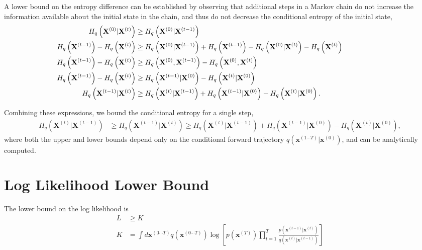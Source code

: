 \documentclass{article}
\newcommand{\mb}{\mathbf}
\newcommand{\pf}{q\left( \mb x^{(t)} | \mb x^{(t-1)} \right)}
\newcommand{\qr}{p\left( \mb x^{(t-1)} | \mb x^{(t)} \right)}
\newcommand{\qst}{p \left( \mb x^{(T)} \right)}
\newcommand{\ptraj}{q\left( \mb x^{(0\cdots T)} \right)}
\newcommand{\pcondtraj}{q\left( \mb x^{(1\cdots T)} | \mb x^{(0)} \right)}
\begin{document}
A lower bound on the entropy difference can be established by observing that additional steps in a Markov chain do not increase the information 
available about the initial state in the chain, and thus do not decrease the conditional entropy of the initial state,
\begin{align}
\hspace{-2cm}
H_q\left( \mb X^{(0)} | \mb X^{(t)} \right) &\ge H_q\left( \mb X^{(0)} | \mb X^{(t-1)} \right) \\
\hspace{-2cm}
H_q\left( \mb X^{(t-1)} \right) - H_q\left( \mb X^{(t)} \right) &\ge
	H_q\left( \mb X^{(0)} | \mb X^{(t-1)} \right) + H_q\left( \mb X^{(t-1)} \right) - H_q\left( \mb X^{(0)} | \mb X^{(t)} \right) - H_q\left( \mb X^{(t)} \right) \\
\hspace{-2cm}
H_q\left( \mb X^{(t-1)} \right) - H_q\left( \mb X^{(t)} \right) &\ge
	H_q\left( \mb X^{(0)}, \mb X^{(t-1)} \right) - H_q\left( \mb X^{(0)}, \mb X^{(t)} \right)  \\
\hspace{-2cm}
H_q\left( \mb X^{(t-1)} \right) - H_q\left( \mb X^{(t)} \right) &\ge
	H_q\left( \mb X^{(t-1)} | \mb X^{(0)} \right)  - H_q\left( \mb X^{(t)} | \mb X^{(0)} \right) \label{eq diff ub} \\
\hspace{-2cm}
H_q\left( \mb X^{(t-1)} | \mb X^{(t)} \right) &\ge H_q\left( \mb X^{(t)} | \mb X^{(t-1)} \right) + H_q\left( \mb X^{(t-1)} | \mb X^{(0)} \right)  - H_q\left( \mb X^{(t)} | \mb X^{(0)} \right)
.
\end{align}

Combining these expressions, we bound the conditional entropy for a single step, 
\begin{align}
H_q\left( \mb X^{(t)} | \mb X^{(t-1)} \right)
&\ge
H_q\left( \mb X^{(t-1)} | \mb X^{(t)} \right)
\ge
H_q\left( \mb X^{(t)} | \mb X^{(t-1)} \right) + H_q\left( \mb X^{(t-1)} | \mb X^{(0)} \right)  - H_q\left( \mb X^{(t)} | \mb X^{(0)} \right)
,
\end{align}
where both the upper and lower bounds depend only on the conditional forward trajectory $\pcondtraj$, and can be analytically computed.

\section{Log Likelihood Lower Bound}\label{app bound}

The lower bound on the log likelihood is
\begin{align}
L
&\geq K \\
K &= \int d\mb x^{(0 \cdots T)} \ptraj  \log \left[ \qst \prod_{t=1}^T \frac{\qr}{\pf} \right] \\
\end{align}
\end{document}
